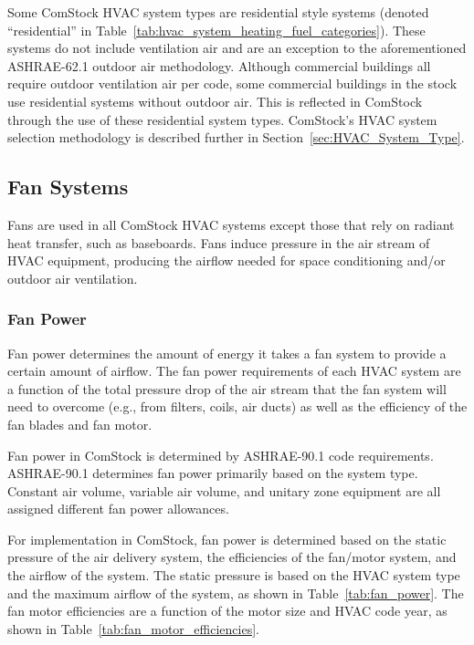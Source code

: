 Some ComStock HVAC system types are residential style systems (denoted ``residential'' in Table~\ref{tab:hvac_system_heating_fuel_categories}). These systems do not include ventilation air and are an exception to the aforementioned ASHRAE-62.1 outdoor air methodology. Although commercial buildings all require outdoor ventilation air per code, some commercial buildings in the stock use residential systems without outdoor air. This is reflected in ComStock through the use of these residential system types. ComStock's HVAC system selection methodology is described further in Section~\ref{sec:HVAC_System_Type}.




\pagebreak
\subsection{Fan Systems}

Fans are used in all ComStock HVAC systems except those that rely on radiant heat transfer, such as baseboards. Fans induce pressure in the air stream of HVAC equipment, producing the airflow needed for space conditioning and/or outdoor air ventilation.

\subsubsection{Fan Power}

Fan power determines the amount of energy it takes a fan system to provide a certain amount of airflow. The fan power requirements of each HVAC system are a function of the total pressure drop of the air stream that the fan system will need to overcome (e.g., from filters, coils, air ducts) as well as the efficiency of the fan blades and fan motor.

Fan power in ComStock is determined by ASHRAE-90.1 code requirements. ASHRAE-90.1 determines fan power primarily based on the system type. Constant air volume, variable air volume, and unitary zone equipment are all assigned different fan power allowances.

For implementation in ComStock, fan power is determined based on the static pressure of the air delivery system, the efficiencies of the fan/motor system, and the airflow of the system. The static pressure is based on the HVAC system type and the maximum airflow of the system, as shown in Table~\ref{tab:fan_power}. The fan motor efficiencies are a function of the motor size and HVAC code year, as shown in Table~\ref{tab:fan_motor_efficiencies}.

